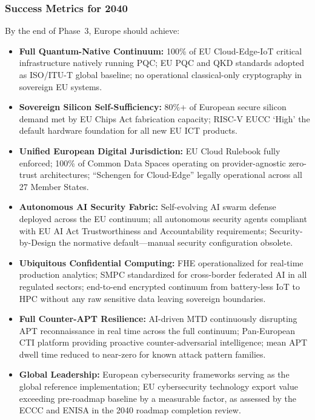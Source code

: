 \documentclass{ieeeaccess}
\begin{document}
\subsubsection*{Success Metrics for 2040}
By the end of Phase~3, Europe should achieve:
\begin{itemize}
    \item \textbf{Full Quantum-Native Continuum:}
    100\% of EU Cloud-Edge-IoT critical infrastructure natively running PQC; EU PQC
    and QKD standards adopted as ISO/ITU-T global baseline; no operational classical-only
    cryptography in sovereign EU systems.

    \item \textbf{Sovereign Silicon Self-Sufficiency:}
    80\%+ of European secure silicon demand met by EU Chips Act fabrication capacity;
    RISC-V EUCC `High' the default hardware foundation for all new EU ICT products.

    \item \textbf{Unified European Digital Jurisdiction:}
    EU Cloud Rulebook fully enforced; 100\% of Common Data Spaces operating on
    provider-agnostic zero-trust architectures; ``Schengen for Cloud-Edge'' legally
    operational across all 27 Member States.

    \item \textbf{Autonomous AI Security Fabric:}
    Self-evolving AI swarm defense deployed across the EU continuum; all autonomous
    security agents compliant with EU AI Act Trustworthiness and Accountability requirements;
    Security-by-Design the normative default---manual security configuration obsolete.

    \item \textbf{Ubiquitous Confidential Computing:}
    FHE operationalized for real-time production analytics; SMPC standardized for
    cross-border federated AI in all regulated sectors; end-to-end encrypted continuum
    from battery-less IoT to HPC without any raw sensitive data leaving sovereign boundaries.

    \item \textbf{Full Counter-APT Resilience:}
    AI-driven MTD continuously disrupting APT reconnaissance in real time across the full
    continuum; Pan-European CTI platform providing proactive counter-adversarial intelligence;
    mean APT dwell time reduced to near-zero for known attack pattern families.

    \item \textbf{Global Leadership:}
    European cybersecurity frameworks serving as the global reference implementation;
    EU cybersecurity technology export value exceeding pre-roadmap baseline by a measurable
    factor, as assessed by the ECCC and ENISA in the 2040 roadmap completion review.
\end{itemize}
\end{document}
